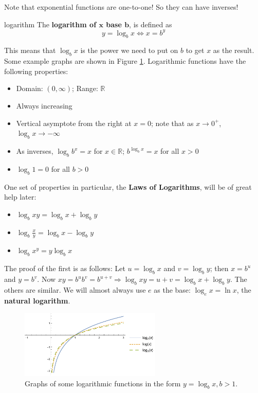 \documentclass[letterpaper, 11pt, openany]{book}
\theoremstyle{mytheoremstyle}
\theoremstyle{myexamplestyle}
\begin{document}
Note that exponential functions are one-to-one! So they can have inverses!
\begin{definition}{}{logarithm}
    The \textbf{logarithm of \(\bm{x}\) base \(\bm{b}\)}, is defined as 
    \[y = \log_{b} x \Leftrightarrow x = b^{y}\]
\end{definition}
This means that $\log_{b} x$ is the power we need to put on $b$ to get $x$ as the result. Some example graphs are shown in Figure \ref{f:logfunctions}. Logarithmic functions have the following properties:
\begin{itemize}
    \item Domain: $(0, \infty)$; Range: $\mathbb{R}$
    \item Always increasing
    \item Vertical asymptote from the right at $x = 0$; note that as $x \to 0^{+}$, $\log_{b} x \to -\infty$
    \item As inverses, $\log_{b} b^{x} = x$ for $x \in \mathbb{R}$; $b^{\log_{b} x} = x$ for all $x > 0$
    \item $\log_{b} 1 = 0$ for all $b > 0$
\end{itemize}
One set of properties in particular, the \textbf{Laws of Logarithms}, will be of great help later:
\begin{itemize}
    \item $\log_{b} xy = \log_{b} x + \log_{b} y$
    \item $\log_{b} \frac{x}{y} = \log_{b} x - \log_{b} y$
    \item $\log_{b} x^{y} = y \log_{b} x$
\end{itemize}
The proof of the first is as follows: Let $u = \log_{b} x$ and $v = \log_{b} y$; then $x = b^{u}$ and $y = b^{v}$. Now $xy = b^{u}b^{v} = b^{u + v} \Rightarrow \log_{b} xy = u + v = \log_{b} x + \log_{b} y$. The others are similar.
We will almost always use $e$ as the base: $\log_{e} x = \ln x$, the \textbf{natural logarithm}.

\begin{figure}[htbp]
    \centering
        \includegraphics[width = 0.6\textwidth]{Figures/logfunctions.pdf}
    \caption{Graphs of some logarithmic functions in the form $y = \log_{b} x,b > 1$.}
    \label{f:logfunctions}
\end{figure}
\end{document}
